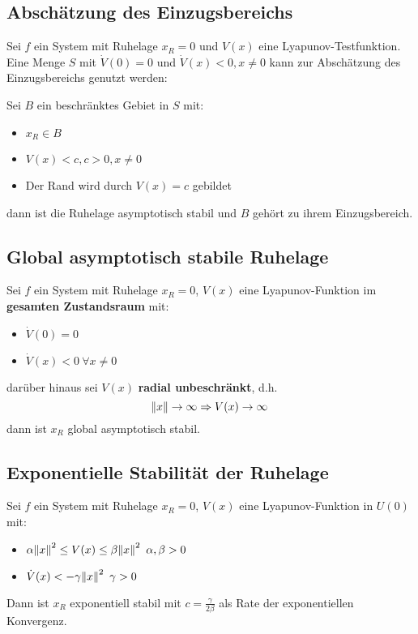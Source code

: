 \subsection{Abschätzung des Einzugsbereichs}
Sei $f$ ein System mit Ruhelage $x_R=0$ und $V(x)$ eine Lyapunov-Testfunktion. Eine
Menge $S$ mit $\dot{V}(0) = 0$ und $\dot{V}(x) < 0, x \neq 0$ kann zur Abschätzung des
Einzugsbereichs genutzt werden:

Sei $B$ ein beschränktes Gebiet in $S$ mit:
\begin{itemize}
    \item $x_R \in B$
    \item $V(x) < c, c>0, x \neq 0$
    \item Der Rand wird durch $V(x)=c$ gebildet
\end{itemize}
dann ist die Ruhelage asymptotisch stabil und $B$ gehört zu ihrem Einzugsbereich.

\subsection{Global asymptotisch stabile Ruhelage}
Sei $f$ ein System mit Ruhelage $x_R=0$, $V(x)$ eine Lyapunov-Funktion im
\textbf{gesamten Zustandsraum} mit:
\begin{itemize}
    \item
        $\dot{V}(0) = 0$
    \item
        $\dot{V}(x) < 0\ \forall x \neq 0$
\end{itemize}
darüber hinaus sei $V(x)$ \textbf{radial unbeschränkt}, d.h.
\begin{equation}
    \norm{x} \to \infty \Rightarrow V(x) \to \infty 
\end{equation}
dann ist $x_R$ global asymptotisch stabil.

\subsection{Exponentielle Stabilität der Ruhelage}
Sei $f$ ein System mit Ruhelage $x_R=0$, $V(x)$ eine Lyapunov-Funktion in $U(0)$ mit:
\begin{itemize}
    \item
        $\alpha \norm{x}^2 \leq V(x) \leq \beta \norm{x}^2\ \alpha, \beta > 0$
    \item
        $\dot{V}(x) < -\gamma \norm{x}^2\ \gamma > 0$
\end{itemize}
Dann ist $x_R$ exponentiell stabil mit $c=\frac{\gamma}{2 \beta}$ als Rate der exponentiellen Konvergenz.

